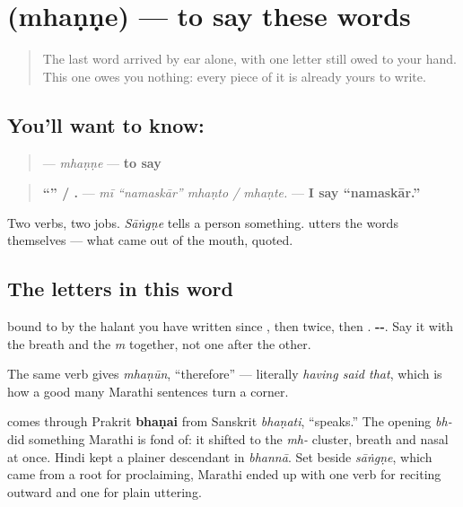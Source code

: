 \section[mhaṇṇe]{ (mhaṇṇe) — to say these words}

\label{lesson:MR-C24-mhanne}



\begin{quote}
The last word arrived by ear alone, with one letter still owed to your hand. This one owes you nothing: every piece of it is already yours to write.
\end{quote}

\subsection*{You'll want to know: }
\begin{quote}
\textbf{} — \emph{mhaṇṇe} — \textbf{to say}
\end{quote}

\begin{quote}
\textbf{ \textquotedblleft{}\textquotedblright{}  / .} — \emph{mī \textquotedblleft{}namaskār\textquotedblright{} mhaṇto / mhaṇte.} — \textbf{I say \textquotedblleft{}namaskār.\textquotedblright{}}
\end{quote}

Two verbs, two jobs. \emph{Sāṅgṇe} tells a person something. \textbf{} utters the words themselves — what came out of the mouth, quoted.

\subsection*{The letters in this word}
\textbf{} bound to \textbf{} by the halant you have written since \textbf{}, then \textbf{} twice, then \textbf{}. \textbf{--}. Say it with the breath and the \emph{m} together, not one after the other.

The same verb gives \textbf{} \emph{mhaṇūn}, \textquotedblleft{}therefore\textquotedblright{} — literally \emph{having said that}, which is how a good many Marathi sentences turn a corner.

\begin{cousinweb}
\textbf{} comes through Prakrit \textbf{bhaṇai} from Sanskrit \textbf{} \emph{bhaṇati}, \textquotedblleft{}speaks.\textquotedblright{} The opening \textbf{} \emph{bh-} did something Marathi is fond of: it shifted to the \textbf{} \emph{mh-} cluster, breath and nasal at once. Hindi kept a plainer descendant in \emph{bhannā}. Set beside \emph{sāṅgṇe}, which came from a root for proclaiming, Marathi ended up with one verb for reciting outward and one for plain uttering.
\end{cousinweb}

